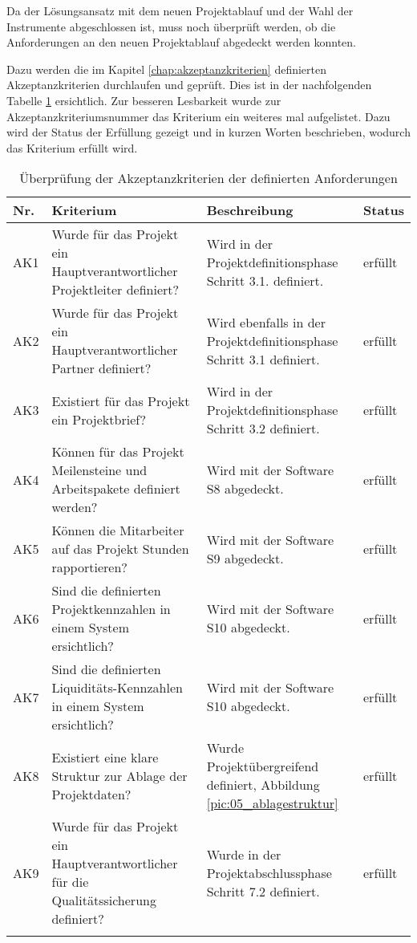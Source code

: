 Da der Lösungsansatz mit dem neuen Projektablauf und der Wahl der Instrumente
abgeschlossen ist, muss noch überprüft werden, ob die Anforderungen an den
neuen Projektablauf abgedeckt werden konnten.

Dazu werden die im Kapitel \ref{chap:akzeptanzkriterien} definierten 
Akzeptanzkriterien durchlaufen und geprüft. Dies ist in der nachfolgenden Tabelle 
\ref{tab:akzeptanzkriterien_test} ersichtlich. Zur besseren Lesbarkeit wurde zur 
Akzeptanzkriteriumsnummer das Kriterium ein weiteres mal aufgelistet. Dazu wird 
der Status der Erfüllung gezeigt und in kurzen Worten beschrieben, wodurch das
Kriterium erfüllt wird.

\clearpage

\begin{longtable}{lp{6cm}p{5cm}l}
    \toprule \textbf{Nr.} & \textbf{Kriterium} & \textbf{Beschreibung} & \textbf{Status} \\
    \midrule AK1 &
        Wurde für das Projekt ein Hauptverantwortlicher Projektleiter definiert? &
        Wird in der Projektdefinitionsphase Schritt 3.1. definiert. &
        erfüllt \\
    \midrule AK2 &
        Wurde für das Projekt ein Hauptverantwortlicher Partner definiert? &
        Wird ebenfalls in der Projektdefinitionsphase Schritt 3.1 definiert. &
        erfüllt \\
    \midrule AK3 &
        Existiert für das Projekt ein Projektbrief? &
        Wird in der Projektdefinitionsphase Schritt 3.2 definiert. &
        erfüllt \\
    \midrule AK4 &
        Können für das Projekt Meilensteine und Arbeitspakete definiert werden? &
        Wird mit der Software S8 abgedeckt. &
        erfüllt \\
    \midrule AK5 &
        Können die Mitarbeiter auf das Projekt Stunden rapportieren? &
        Wird mit der Software S9 abgedeckt. &
        erfüllt \\
    \midrule AK6 &
        Sind die definierten Projektkennzahlen in einem System ersichtlich? &
        Wird mit der Software S10 abgedeckt. &
        erfüllt \\
    \midrule AK7 &
        Sind die definierten Liquiditäts-Kennzahlen in einem System ersichtlich? &
        Wird mit der Software S10 abgedeckt. &
        erfüllt \\
    \midrule AK8 &
        Existiert eine klare Struktur zur Ablage der Projektdaten? &
        Wurde Projektübergreifend definiert, Abbildung \ref{pic:05_ablagestruktur} &
        erfüllt \\
    \midrule AK9 &
        Wurde für das Projekt ein Hauptverantwortlicher für die Qualitätssicherung definiert? &
        Wurde in der Projektabschlussphase Schritt 7.2 definiert. &
        erfüllt \\
    \bottomrule
    \caption[Überprüfung der Akzeptanzkriterien der definierten Anforderungen]{Überprüfung 
        der Akzeptanzkriterien der definierten Anforderungen\footnotemark}
    \label{tab:akzeptanzkriterien_test}
\end{longtable}

